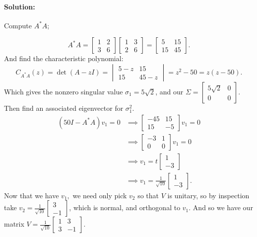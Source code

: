 \documentclass{article}
\begin{document}
\begin{enumerate}
\begin{enumerate}[label= (\alph*)]
\paragraph{Solution: }Compute $A^* A$;

\[
    A^* A=\begin{bmatrix} 1&2\\3&6 \end{bmatrix} \begin{bmatrix} 1&3\\2&6 \end{bmatrix} 
    =\begin{bmatrix} 5&15\\15&45 \end{bmatrix} 
.\] 
And find the characteristic polynomial:
\[
    C_{A^* A}(z)=\det(A-zI)=\begin{vmatrix} 5-z&15\\15&45-z \end{vmatrix}= z^2-50=z(z-50)
.\] 
    Which gives the nonzero singular value $\sigma_1=5\sqrt{2} $, and our $\Sigma=\begin{bmatrix} 5\sqrt{2} &0\\0&0 \end{bmatrix} $. Then find an associated eigenvector for $\sigma_1^2$.
    \begin{align*}
        (50I-A^* A)v_1=0&\implies \begin{bmatrix} -45&15\\15&-5 \end{bmatrix}v_1=0 \\
                        &\implies \begin{bmatrix} -3&1\\0&0\end{bmatrix}v_1=0 \\
                        &\implies v_1=t\begin{bmatrix} 1\\-3 \end{bmatrix} \\
                        &\implies v_1=\frac{1}{\sqrt{10} }\begin{bmatrix} 1\\-3 \end{bmatrix} 
    .\end{align*}
    Now that we have $v_1,$ we need only pick $v_2$ so that $V$ is unitary, so by inspection take $v_2=\frac{1}{\sqrt{10} }\begin{bmatrix} 3\\-1 \end{bmatrix} $, which is normal, and orthogonal to $v_1$. And so we have our matrix $V=\frac{1}{\sqrt{10} }\begin{bmatrix} 1&3\\3&-1 \end{bmatrix} $.


\end{enumerate}
\end{enumerate}
\end{document}
